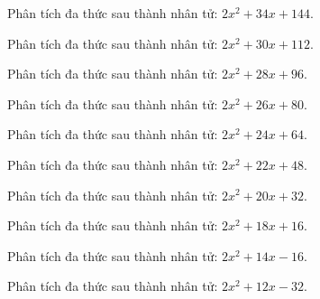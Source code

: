 \begin{bt}
	Phân tích đa thức sau thành nhân tử: $2 x^2 + 34 x + 144$.
\end{bt}
\begin{bt}
	Phân tích đa thức sau thành nhân tử: $2 x^2 + 30 x + 112$.
\end{bt}
\begin{bt}
	Phân tích đa thức sau thành nhân tử: $2 x^2 + 28 x + 96$.
\end{bt}
\begin{bt}
	Phân tích đa thức sau thành nhân tử: $2 x^2 + 26 x + 80$.
\end{bt}
\begin{bt}
	Phân tích đa thức sau thành nhân tử: $2 x^2 + 24 x + 64$.
\end{bt}
\begin{bt}
	Phân tích đa thức sau thành nhân tử: $2 x^2 + 22 x + 48$.
\end{bt}
\begin{bt}
	Phân tích đa thức sau thành nhân tử: $2 x^2 + 20 x + 32$.
\end{bt}
\begin{bt}
	Phân tích đa thức sau thành nhân tử: $2 x^2 + 18 x + 16$.
\end{bt}
\begin{bt}
	Phân tích đa thức sau thành nhân tử: $2 x^2 + 14 x - 16$.
\end{bt}
\begin{bt}
	Phân tích đa thức sau thành nhân tử: $2 x^2 + 12 x - 32$.
\end{bt}
